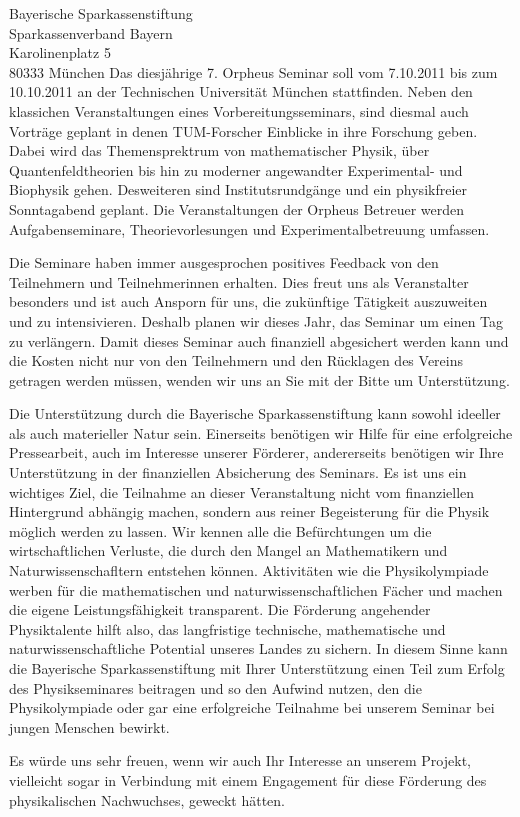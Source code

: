 \documentclass[../style/orpheus,fontsize=11pt]{scrlttr2}
\begin{document}
\begin{letter}{
\noindent Bayerische Sparkassenstiftung \\
Sparkassenverband Bayern\\
Karolinenplatz 5\\
80333 M\"unchen
}
Das diesj\"ahrige 7. Orpheus Seminar soll vom 7.10.2011 bis zum 10.10.2011 an der Technischen Universit\"at M\"unchen stattfinden. Neben den klassichen Veranstaltungen eines Vorbereitungsseminars, sind diesmal auch Vortr\"age geplant in denen TUM-Forscher Einblicke in ihre Forschung geben. Dabei wird das Themensprektrum von mathematischer Physik, \"uber Quantenfeldtheorien bis hin zu moderner angewandter Experimental- und Biophysik gehen.  Desweiteren sind Institutsrundg\"ange und ein physikfreier Sonntagabend geplant.  Die Veranstaltungen der Orpheus Betreuer werden Aufgabenseminare, Theorievorlesungen und Experimentalbetreuung umfassen.  

Die Seminare haben immer ausgesprochen positives Feedback von den Teilnehmern und Teilnehmerinnen erhalten.  Dies freut uns als Veranstalter besonders und ist auch Ansporn f\"ur uns, die zuk\"unftige T\"atigkeit auszuweiten und zu intensivieren.  Deshalb planen wir dieses Jahr, das Seminar um einen Tag zu verl\"angern.  Damit dieses Seminar auch finanziell abgesichert werden kann und die Kosten nicht nur von den Teilnehmern und den R\"ucklagen des Vereins getragen werden m\"ussen, wenden wir uns an Sie mit der Bitte um Unterst\"utzung.

Die Unterst\"utzung durch die Bayerische Sparkassenstiftung kann sowohl ideeller als auch materieller Natur sein.  Einerseits ben\"otigen wir Hilfe f\"ur eine erfolgreiche Pressearbeit, auch im Interesse unserer F\"orderer,  andererseits ben\"otigen wir Ihre Unterst\"utzung in der finanziellen Absicherung des Seminars. Es ist uns ein wichtiges Ziel, die Teilnahme an dieser Veranstaltung nicht vom finanziellen Hintergrund abh\"angig machen, sondern aus reiner Begeisterung f\"ur die Physik m\"oglich werden zu lassen.  Wir kennen alle die Bef\"urchtungen um die wirtschaftlichen Verluste, die durch den Mangel an Mathematikern und Naturwissenschafltern entstehen k\"onnen. Aktivit\"aten wie die Physikolympiade werben f\"ur die mathematischen und naturwissenschaftlichen F\"acher und machen die eigene Leistungsf\"ahigkeit transparent. Die F\"orderung angehender Physiktalente hilft also, das langfristige technische, mathematische und naturwissenschaftliche Potential unseres Landes zu sichern. In diesem Sinne kann die Bayerische Sparkassenstiftung mit Ihrer Unterst\"utzung einen Teil zum Erfolg des Physikseminares beitragen und so den Aufwind nutzen, den die Physikolympiade oder gar eine erfolgreiche Teilnahme bei unserem Seminar bei jungen Menschen bewirkt.

Es w\"urde uns sehr freuen, wenn wir auch Ihr Interesse an unserem Projekt, vielleicht sogar in Verbindung mit einem Engagement f\"ur diese F\"orderung des physikalischen Nachwuchses, geweckt h\"atten.


\end{letter}
\end{document}
